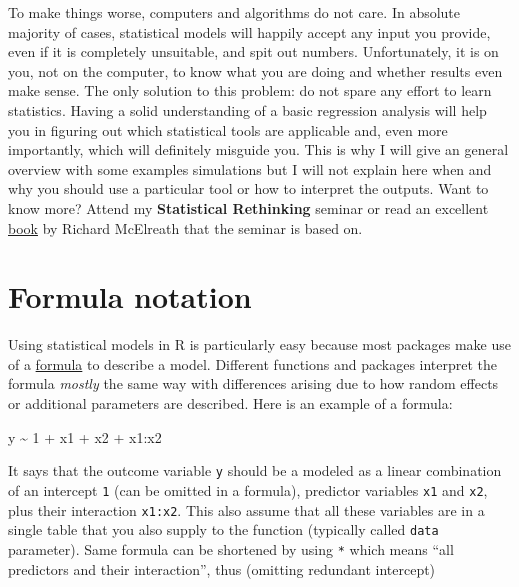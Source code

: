 \documentclass[
]{book}
\newenvironment{Shaded}{\begin{snugshade}}{\end{snugshade}}
\newcommand{\DecValTok}[1]{\textcolor[rgb]{0.00,0.00,0.81}{#1}}
\newcommand{\NormalTok}[1]{#1}
\newcommand{\SpecialCharTok}[1]{\textcolor[rgb]{0.00,0.00,0.00}{#1}}
\begin{document}
To make things worse, computers and algorithms do not care. In absolute majority of cases, statistical models will happily accept any input you provide, even if it is completely unsuitable, and spit out numbers. Unfortunately, it is on you, not on the computer, to know what you are doing and whether results even make sense. The only solution to this problem: do not spare any effort to learn statistics. Having a solid understanding of a basic regression analysis will help you in figuring out which statistical tools are applicable and, even more importantly, which will definitely misguide you. This is why I will give an general overview with some examples simulations but I will not explain here when and why you should use a particular tool or how to interpret the outputs. Want to know more? Attend my \textbf{Statistical Rethinking} seminar or read an excellent \href{https://www.routledge.com/Statistical-Rethinking-A-Bayesian-Course-with-Examples-in-R-and-STAN/McElreath/p/book/9780367139919}{book} by Richard McElreath that the seminar is based on.

\hypertarget{formula-notation}{%
\section{Formula notation}\label{formula-notation}}

Using statistical models in R is particularly easy because most packages make use of a \href{https://stat.ethz.ch/R-manual/R-devel/library/stats/html/formula.html}{formula} to describe a model. Different functions and packages interpret the formula \emph{mostly} the same way with differences arising due to how random effects or additional parameters are described. Here is an example of a formula:

\begin{Shaded}
\begin{Highlighting}[]
\NormalTok{y }\SpecialCharTok{\textasciitilde{}} \DecValTok{1} \SpecialCharTok{+}\NormalTok{ x1 }\SpecialCharTok{+}\NormalTok{ x2 }\SpecialCharTok{+}\NormalTok{ x1}\SpecialCharTok{:}\NormalTok{x2}
\end{Highlighting}
\end{Shaded}

It says that the outcome variable \texttt{y} should be a modeled as a linear combination of an intercept \texttt{1} (can be omitted in a formula), predictor variables \texttt{x1} and \texttt{x2}, plus their interaction \texttt{x1:x2}. This also assume that all these variables are in a single table that you also supply to the function (typically called \texttt{data} parameter). Same formula can be shortened by using \texttt{*} which means ``all predictors and their interaction'', thus (omitting redundant intercept)
\end{document}
